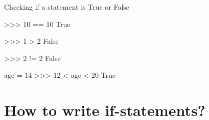\documentclass[
  american,
  ignorenonframetext,
]{beamer}
\begin{document}
\begin{frame}{Checking if a statement is True or False}
\protect\hypertarget{checking-if-a-statement-is-true-or-false}{}

\begin{pythoncode}

>>> 10 == 10
True

\end{pythoncode}

\begin{pythoncode}

>>> 1 > 2
False

\end{pythoncode}

\begin{pythoncode}

>>> 2 != 2
False

\end{pythoncode}

\begin{pythoncode}

age = 14
>>>  12 < age < 20
True

\end{pythoncode}


\end{frame}

\hypertarget{how-to-write-if-statements}{%
\section{How to write if-statements?}\label{how-to-write-if-statements}}
\end{document}
